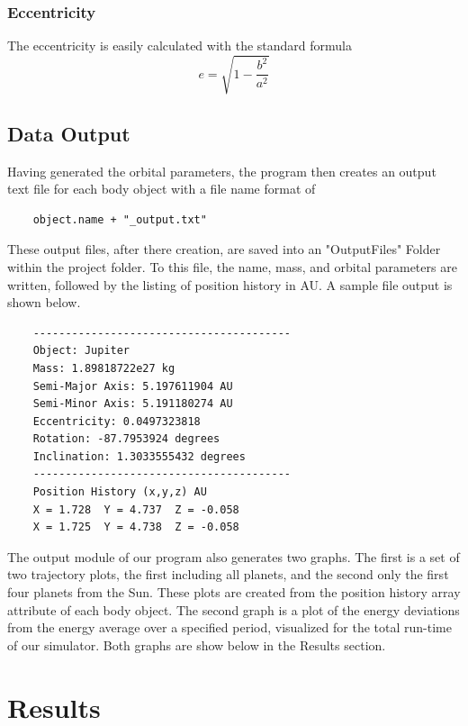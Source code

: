 \documentclass[a4paper,12pt]{article} %
\numberwithin{equation}{section} %
\numberwithin{figure}{section} %
\begin{document}
\subsubsection{Eccentricity}

The eccentricity is easily calculated with the standard formula $$e=\sqrt{1-\frac{b^2}{a^2}}$$

\subsection{Data Output}
Having generated the orbital parameters, the program then creates an output text file for each body object with a file name format of 

\begin{verbatim}
    object.name + "_output.txt"
\end{verbatim}

These output files, after there creation, are saved into an "OutputFiles" Folder within the project folder. To this file, the name, mass, and orbital parameters are written, followed by the listing of position history in AU. A sample file output is shown below.

\begin{verbatim}
    ----------------------------------------
    Object: Jupiter
    Mass: 1.89818722e27 kg
    Semi-Major Axis: 5.197611904 AU
    Semi-Minor Axis: 5.191180274 AU
    Eccentricity: 0.0497323818
    Rotation: -87.7953924 degrees
    Inclination: 1.3033555432 degrees
    ----------------------------------------
    Position History (x,y,z) AU
    X = 1.728  Y = 4.737  Z = -0.058
    X = 1.725  Y = 4.738  Z = -0.058
\end{verbatim}

The output module of our program also generates two graphs. The first is a set of two trajectory plots, the first including all planets, and the second only the first four planets from the Sun. These plots are created from the position history array attribute of each body object. The second graph is a plot of the energy deviations from the energy average over a specified period, visualized for the total run-time of our simulator. Both graphs are show below in the Results section.

\section{Results}
\end{document}
